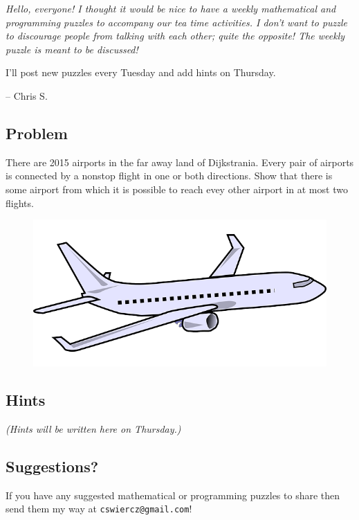 \documentclass[12pt]{article}
\title{AMath Tea Time --- Puzzle #1}
\begin{document}
\maketitle

{\it Hello, everyone! I thought it would be nice to have a weekly mathematical
  and programming puzzles to accompany our tea time activities. I don't want to
  puzzle to discourage people from talking with each other; quite the opposite!
  The weekly puzzle is meant to be discussed!

  I'll post new puzzles every Tuesday and add hints on Thursday.

  --
  Chris S.}

\subsection*{Problem}

There are 2015 airports in the far away land of Dijkstrania. Every pair of
airports is connected by a nonstop flight in one or both directions. Show that
there is some airport from which it is possible to reach evey other airport in
at most two flights.

\begin{figure}[H]
  \centering
  \includegraphics{airplane.png}
\end{figure}

\subsection*{Hints}

{\it (Hints will be written here on Thursday.)}

\vspace{6cm}

\subsection*{Suggestions?}

If you have any suggested mathematical or programming puzzles to share then send
them my way at {\tt cswiercz@gmail.com}!
\end{document}
